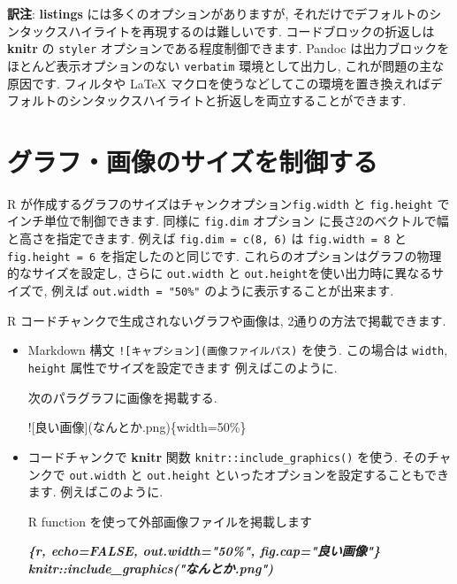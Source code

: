 \documentclass[
  11pt,
]{bxjsreport}
\newenvironment{Shaded}{\begin{snugshade}}{\end{snugshade}}
\newcommand{\AlertTok}[1]{\textcolor[rgb]{0.94,0.16,0.16}{#1}}
\newcommand{\InformationTok}[1]{\textcolor[rgb]{0.56,0.35,0.01}{\textbf{\textit{#1}}}}
\newcommand{\NormalTok}[1]{#1}
\begin{document}
\textbf{訳注}: \textbf{listings} には多くのオプションがありますが, それだけでデフォルトのシンタックスハイライトを再現するのは難しいです. コードブロックの折返しは \textbf{knitr} の \texttt{styler} オプションである程度制御できます. Pandoc は出力ブロックをほとんど表示オプションのない \texttt{verbatim} 環境として出力し, これが問題の主な原因です. フィルタや LaTeX マクロを使うなどしてこの環境を置き換えればデフォルトのシンタックスハイライトと折返しを両立することができます.

\hypertarget{figure-size}{%
\section{グラフ・画像のサイズを制御する}\label{figure-size}}

R が作成するグラフのサイズはチャンクオプション\texttt{fig.width}  と \texttt{fig.height} でインチ単位で制御できます. 同様に \texttt{fig.dim} オプション に長さ2のベクトルで幅と高さを指定できます. 例えば \texttt{fig.dim = c(8, 6)} は \texttt{fig.width = 8} と \texttt{fig.height = 6} を指定したのと同じです. これらのオプションはグラフの物理的なサイズを設定し, さらに \texttt{out.width} と \texttt{out.height}を使い出力時に異なるサイズで, 例えば \texttt{out.width = "50\%"} のように表示することが出来ます.

R コードチャンクで生成されないグラフや画像は, 2通りの方法で掲載できます.

\begin{itemize}
\item
  Markdown 構文 \texttt{!{[}キャプション{]}(画像ファイルパス)} を使う. この場合は \texttt{width}, \texttt{height} 属性でサイズを設定できます 例えばこのように.

\begin{Shaded}
\begin{Highlighting}[]
\NormalTok{次のパラグラフに画像を掲載する.}

\AlertTok{![良い画像](なんとか.png)}\NormalTok{\{width=50\%\}}
\end{Highlighting}
\end{Shaded}
\item
  コードチャンクで \textbf{knitr} 関数 \texttt{knitr::include\_graphics()} を使う. そのチャンクで \texttt{out.width} と \texttt{out.height} といったオプションを設定することもできます. 例えばこのように.

\begin{Shaded}
\begin{Highlighting}[]
\NormalTok{R function を使って外部画像ファイルを掲載します}

\InformationTok{\textasciigrave{}\textasciigrave{}\textasciigrave{}\{r, echo=FALSE, out.width="50\%", fig.cap="良い画像"\}}
\InformationTok{knitr::include\_graphics("なんとか.png")}
\InformationTok{\textasciigrave{}\textasciigrave{}\textasciigrave{}}
\end{Highlighting}
\end{Shaded}
\end{itemize}
\end{document}
